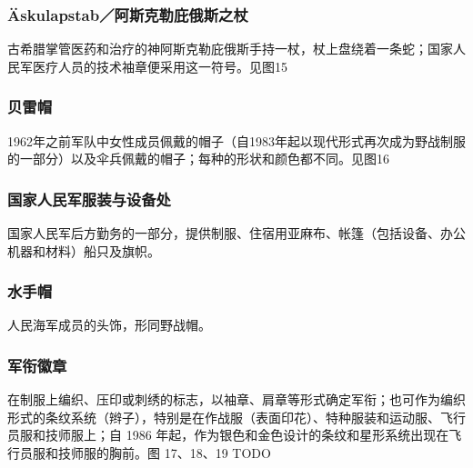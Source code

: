 \subsubsection*{Äskulapstab／阿斯克勒庇俄斯之杖}%

古希腊掌管医药和治疗的神阿斯克勒庇俄斯手持一杖，杖上盘绕着一条蛇；国家人民军医疗人员的技术袖章便采用这一符号。见图15

\subsubsection*{贝雷帽}%

1962年之前军队中女性成员佩戴的帽子（自1983年起以现代形式再次成为野战制服的一部分）以及伞兵佩戴的帽子；每种的形状和颜色都不同。见图16

\subsubsection*{国家人民军服装与设备处}%

国家人民军后方勤务的一部分，提供制服、住宿用亚麻布、帐篷（包括设备、办公机器和材料）船只及旗帜。

\subsubsection*{水手帽}%

人民海军成员的头饰，形同野战帽。

\subsubsection*{军衔徽章}%

在制服上编织、压印或刺绣的标志，以袖章、肩章等形式确定军衔；也可作为编织形式的条纹系统（辫子），特别是在作战服（表面印花）、特种服装和运动服、飞行员服和技师服上；自 1986 年起，作为银色和金色设计的条纹和星形系统出现在飞行员服和技师服的胸前。图 17、18、19  TODO

